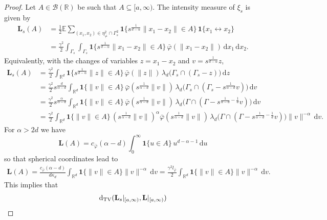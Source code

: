 \documentclass{article}
\theoremstyle{definition}
\numberwithin{equation}{section}
\theoremstyle{remark}
\newcommand{\E}{\mathbb{E}}
\newcommand{\R}{\mathbb{R}}
\begin{document}
\begin{proof}
Let $A\in\mathcal{B}(\mathbb{R})$ be such that $A\subseteq[a,\infty)$. The intensity measure of $\xi_s$ is given by
\begin{align*}
\mathbf{L}_s(A)
& = \frac{1}{2}\E \sum_{(x_1,x_2)\in\eta^2_{\neq}\cap\Gamma_s^2}
\mathbf{1}\Big\{s^{\frac{1}{d-\alpha}}\|x_1-x_2\|\in A\Big\}\,
\mathbf{1}\{x_1\leftrightarrow x_2\} \\
&= \frac{\gamma^2}{2}\int_{\Gamma_s}\int_{\Gamma_s}
\mathbf{1}\Big\{s^{\frac{1}{d-\alpha}}\|x_1-x_2\|\in A\Big\}\,
\bar\varphi(\|x_1-x_2\|)\,\mathrm{d}x_1\,\mathrm{d}x_2.
\end{align*}
Equivalently, with the changes of variables $z=x_1-x_2$ and $v=s^{\frac{1}{d-\alpha}}z$,
\begin{align*}
\mathbf{L}_s(A)
& = \frac{\gamma^2}{2}\int_{\R^d}
\mathbf{1}\Big\{s^{\frac{1}{d-\alpha}}\|z\|\in A\Big\}\,
\bar\varphi(\|z\|)\,
\lambda_d\big(\Gamma_s\cap(\Gamma_s-z)\big)\,\mathrm{d}z \\
& = \frac{\gamma^2}{2} s^{\frac{d}{\alpha-d}} \int_{\R^d}
\mathbf{1}\Big\{\|v\|\in A\Big\}\,
\bar\varphi(s^{\frac{1}{\alpha-d}}\|v\|)\,
\lambda_d\big(\Gamma_s\cap(\Gamma_s-s^{\frac{1}{\alpha-d}}v)\big)\,\mathrm{d}v\\
& = \frac{\gamma^2}{2} s^{\frac{\alpha}{\alpha-d}} \int_{\R^d}
\mathbf{1}\Big\{\|v\|\in A\Big\}\,
\bar\varphi(s^{\frac{1}{\alpha-d}}\|v\|)\,
\lambda_d\big(\Gamma\cap(\Gamma-s^{\frac{1}{\alpha-d}-\frac{1}{d}}v)\big)\,\mathrm{d}v \\
& = \frac{\gamma^2}{2} \int_{\R^d}
\mathbf{1}\Big\{\|v\|\in A\Big\}\, (s^{\frac{1}{\alpha-d}}\|v\|)^\alpha
\bar\varphi(s^{\frac{1}{\alpha-d}}\|v\|)\,
\lambda_d\big(\Gamma\cap(\Gamma-s^{\frac{1}{\alpha-d}-\frac{1}{d}}v)\big) \|v\|^{-\alpha}\,\mathrm{d}v.
\end{align*}
For $\alpha>2d$ we have
$$
\mathbf{L}(A)= c_{\bar\varphi}(\alpha-d)\int_0^\infty \mathbf{1}\{u\in A\}\,u^{d-\alpha-1}\,\mathrm{d}u
$$
so that spherical coordinates lead to
\begin{align*}
\mathbf{L}(A) = \frac{c_{\bar\varphi}(\alpha-d)}{d\kappa_d}\int_{\mathbb{R}^d} \mathbf{1}\{\|v\|\in A\} \|v\|^{-\alpha} \,\mathrm{d}v  = \frac{\gamma^2 l_{\bar{\varphi}}}{2}\int_{\mathbb{R}^d} \mathbf{1}\{\|v\|\in A\} \|v\|^{-\alpha} \,\mathrm{d}v.
\end{align*}
This implies that
\begin{align*}
& \mathrm{d}_{\rm TV}(\mathbf{L}_s|_{[a,\infty)},\mathbf{L}|_{[a,\infty)}) \\

\end{align*}
\end{proof}
\end{document}
